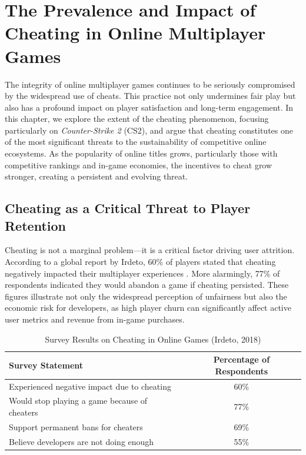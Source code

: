 \chapter{The Prevalence and Impact of Cheating in Online Multiplayer Games}

The integrity of online multiplayer games continues to be seriously compromised by the widespread use of cheats. This practice not only undermines fair play but also has a profound impact on player satisfaction and long-term engagement. In this chapter, we explore the extent of the cheating phenomenon, focusing particularly on \textit{Counter-Strike 2} (CS2), and argue that cheating constitutes one of the most significant threats to the sustainability of competitive online ecosystems. As the popularity of online titles grows, particularly those with competitive rankings and in-game economies, the incentives to cheat grow stronger, creating a persistent and evolving threat.

\section{Cheating as a Critical Threat to Player Retention}

Cheating is not a marginal problem—it is a critical factor driving user attrition. According to a global report by Irdeto, 60\% of players stated that cheating negatively impacted their multiplayer experiences \cite{irdeto2018global}. More alarmingly, 77\% of respondents indicated they would abandon a game if cheating persisted. These figures illustrate not only the widespread perception of unfairness but also the economic risk for developers, as high player churn can significantly affect active user metrics and revenue from in-game purchases.

\begin{table}[H]
\centering
\caption{Survey Results on Cheating in Online Games (Irdeto, 2018)}
\label{tab:irdeto-survey}
\begin{tabular}{|l|c|}
\hline
\textbf{Survey Statement} & \textbf{Percentage of Respondents} \\
\hline
Experienced negative impact due to cheating & 60\% \\
Would stop playing a game because of cheaters & 77\% \\
Support permanent bans for cheaters & 69\% \\
Believe developers are not doing enough & 55\% \\
\hline
\end{tabular}
\end{table}

